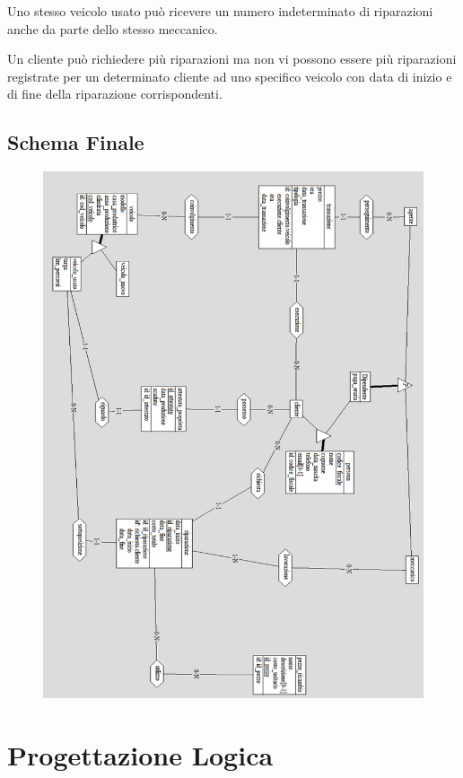 \documentclass[a4paper,12pt]{report}
\begin{document}
Uno stesso veicolo usato può ricevere un numero indeterminato di riparazioni anche da parte dello stesso meccanico.

Un cliente può richiedere più riparazioni ma non vi possono essere più riparazioni registrate per un determinato cliente ad uno 
%
specifico veicolo con data di inizio e di fine della riparazione corrispondenti.

\newpage
\section{Schema Finale}
	\begin{figure}[H]
		\centering
		\includegraphics[scale=0.9]{img/schema_finale.png}
	\end{figure}

\chapter{Progettazione Logica}
\end{document}
